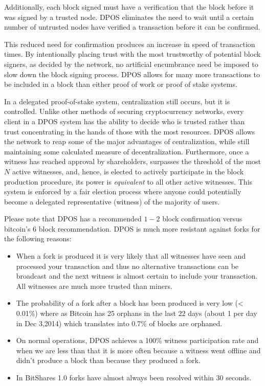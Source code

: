 Additionally, each block signed must have a verification that the block
before it was signed by a trusted node. DPOS eliminates the need to wait until
a certain number of untrusted nodes have verified a transaction before it can
be confirmed.

This reduced need for confirmation produces an increase in speed of transaction
times. By intentionally placing trust with the most trustworthy of potential
block signers, as decided by the network, no artificial encumbrance need be
imposed to slow down the block signing process. DPOS allows for many more
transactions to be included in a block than either proof of work or proof of
stake systems.

In a delegated proof-of-stake system, centralization still occurs, but it is
controlled. Unlike other methods of securing cryptocurrency networks, every
client in a DPOS system has the ability to decide who is trusted rather than
trust concentrating in the hands of those with the most resources. DPOS allows
the network to reap some of the major advantages of centralization, while still
maintaining some calculated measure of decentralization. Furthermore, once a
witness has reached approval by shareholders, surpasses the threshold of the
most $N$ active witnesses, and, hence, is elected to actively participate in
the block production procedure, its power is \emph{equivalent} to all other
active witnesses. This system is enforced by a fair election process where
anyone could potentially become a delegated representative (witness) of the
majority of users.

Please note that DPOS has a recommended $1-2$ block confirmation versus
bitcoin's 6 block recommendation. DPOS is much more resistant against forks for
the following reasons:
\begin{itemize}
\item When a fork is produced it is
      very likely that all witnesses have seen and processed your transaction and
      thus no alternative transactions can be broadcast and the next witness is
      almost certain to include your transaction. All witnesses are much more
      trusted than miners.
\item The probability of a fork after a block has been produced is very low (<
      0.01\%) where as Bitcoin has 25 orphans in the last 22 days (about 1 per day in
      Dec 3,2014) which translates into 0.7\% of blocks are orphaned.
\item On normal operations, DPOS achieves a 100\% witness participation rate and when
      we are less than that it is more often because a witness went offline and didn't
      produce a block than because they produced a fork. 
\item In BitShares 1.0 forks have almost always been resolved within 30 seconds. 
\end{itemize}

